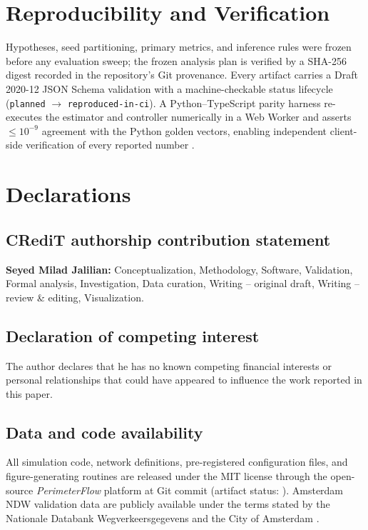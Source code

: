 \documentclass[a4paper,fleqn]{cas-dc}
\begin{document}
\section{Reproducibility and Verification}
\label{sec:prereg}
Hypotheses, seed partitioning, primary metrics, and inference rules were frozen before any evaluation sweep; the frozen analysis plan is verified by a SHA-256 digest recorded in the repository's Git provenance. Every artifact carries a Draft 2020-12 JSON Schema validation with a machine-checkable status lifecycle (\texttt{planned} $\rightarrow$ \texttt{reproduced-in-ci}). A Python--TypeScript parity harness re-executes the estimator and controller numerically in a Web Worker and asserts $\le 10^{-9}$ agreement with the Python golden vectors, enabling independent client-side verification of every reported number \cite{sandve2013ten}.

\section{Declarations}

\subsection*{CRediT authorship contribution statement}
\textbf{Seyed Milad Jalilian:} Conceptualization, Methodology, Software, Validation, Formal analysis, Investigation, Data curation, Writing -- original draft, Writing -- review \& editing, Visualization.

\subsection*{Declaration of competing interest}
The author declares that he has no known competing financial interests or personal relationships that could have appeared to influence the work reported in this paper.

\subsection*{Data and code availability}
All simulation code, network definitions, pre-registered configuration files, and figure-generating routines are released under the MIT license through the open-source \textit{PerimeterFlow} platform at Git commit \texttt{\ArtifactGitSHA} (artifact status: \texttt{\ArtifactStatus}). Amsterdam NDW validation data are publicly available under the terms stated by the Nationale Databank Wegverkeersgegevens and the City of Amsterdam \cite{ndw2024amsterdam}.
\end{document}
